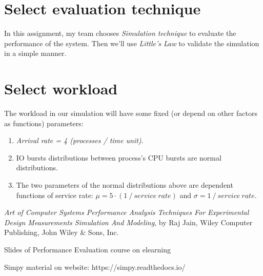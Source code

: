 \documentclass[13pt,a4paper]{article}
\begin{document}
	\section{Select evaluation technique}
		In this assignment, my team chooses \textit{Simulation technique} to evaluate the performance of the system. Then we’ll use \textit{Little’s Law} to validate the simulation in a simple manner.
	\section{Select workload}
		The workload in our simulation will have some fixed (or depend on other factors as functions) parameters:
		\begin{enumerate}[-]
			\item \textit{Arrival rate = 4 (processes / time unit)}.
			\item IO bursts distributions between process’s CPU bursts are normal distributions.
			\item The two parameters of the normal distributions above are dependent functions of service rate: $\mu = 5 \cdot (1\ /\ service\ rate)$ and $\sigma = 1\ /\ service\ rate$.			
		\end{enumerate}
	
	\newpage
	\begin{thebibliography}{80}
		\textit{Art of Computer Systems Performance Analysis Techniques For Experimental Design Measurements Simulation And Modeling}, by Raj Jain, Wiley Computer Publishing, John Wiley \& Sons, Inc.
		
		Slides of Performance Evaluation course on elearning
		
		Simpy material on website: https://simpy.readthedocs.io/
	\end{thebibliography}
\end{document}
